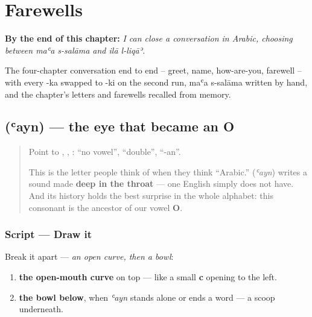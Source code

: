 
\chapter{Farewells}
\label{ch:ar-farewells}

\begin{chapteropening}
\textbf{By the end of this chapter:} \emph{I can close a conversation in Arabic, choosing between maʿa s-salāma and ilā l-liqāʾ.}

The four-chapter conversation end to end -- greet, name, how-are-you, farewell -- with every -ka swapped to -ki on the second run, maʿa s-salāma written by hand, and the chapter's letters and farewells recalled from memory.
\end{chapteropening}

\section[\texorpdfstring{\ar{ع} (ʿayn)}{ع (ʿayn)}]{ (ʿayn) — the eye that became an O}

\label{lesson:AR-W10-ayn}



\begin{quote}
Point to \textbf{}, \textbf{}, \textbf{}: “no vowel”, “double”, “-an”.

This is the letter people think of when they think \textquotedblleft{}Arabic.\textquotedblright{} \textbf{} (\emph{ʿayn}) writes a sound made \textbf{deep in the throat} — one English simply does not have. And its history holds the best surprise in the whole alphabet: this consonant is the ancestor of our vowel \textbf{O}.
\end{quote}

\subsection*{Script — Draw it}

Break it apart — \emph{an open curve, then a bowl}:

\begin{enumerate}
\raggedright
  \item \textbf{the open-mouth curve} on top — like a small \textbf{c} opening to the left.
  \item \textbf{the bowl below}, when \emph{ʿayn} stands alone or ends a word — a scoop underneath.
\end{enumerate}

